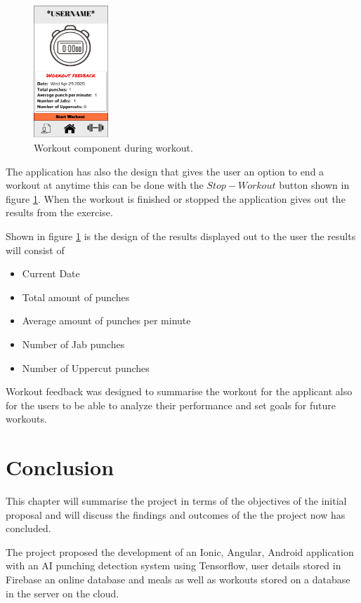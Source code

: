 \documentclass[a4paper,12pt]{report}
\begin{document}
\begin{figure}
\centering
\includegraphics[width=0.25\textwidth]{images/afterWorkout.png}
\caption{\label{fig:ipWComponent}Workout component during workout.}
\end{figure}




The application has also the design that gives the user an option to end a workout at anytime this can be done with the $Stop-Workout$ button shown in figure \ref{fig:ipWComponent}.
When the workout is finished or stopped the application gives out the results from the exercise.

Shown in figure \ref{fig:ipWComponent} is the design of the results displayed out to the user the results will consist of 
\begin{itemize}
    \item Current Date 
    \item Total amount of punches
    \item Average amount of punches per minute
    \item Number of Jab punches
    \item Number of Uppercut punches
\end{itemize}
Workout feedback was designed to summarise the workout for the applicant also for the users to be able to analyze their performance and set goals for future workouts. 




\chapter{Conclusion}
This chapter will summarise the project in terms of the objectives of
the initial proposal and will discuss the findings and outcomes of the
the project now has concluded.

The project proposed the development of an Ionic, Angular, Android application
with an AI punching detection system using Tensorflow, user details stored in Firebase an online
database and meals as well as workouts stored on a database in the server on the cloud.
\end{document}
